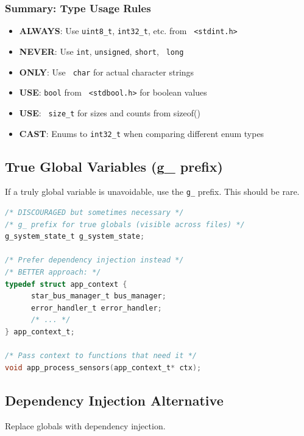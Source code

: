 \subsubsection{Summary:
      Type Usage Rules}

\begin{itemize}
    \item \textbf{ALWAYS}: Use \texttt{uint8\_t}, \texttt{int32\_t}, etc. from \texttt{
<stdint.h>}
    \item \textbf{NEVER}: Use \texttt{int}, \texttt{unsigned}, \texttt{short}, \texttt{
      long}
    \item \textbf{ONLY}: Use \texttt{
      char} for actual character strings
    \item \textbf{USE}: \texttt{bool} from \texttt{
<stdbool.h>} for boolean values
    \item \textbf{USE}: \texttt{
      size\_t} for sizes and counts from sizeof()
    \item \textbf{CAST}: Enums to \texttt{int32\_t} when comparing different enum types
\end{itemize}

\subsection{True Global Variables (g\_ prefix)}

If a truly global variable is unavoidable, use the \texttt{g\_} prefix. This should be rare.

\begin{lstlisting}[language=C]
/* DISCOURAGED but sometimes necessary */
/* g_ prefix for true globals (visible across files) */
g_system_state_t g_system_state;

/* Prefer dependency injection instead */
/* BETTER approach: */
typedef struct app_context {
      star_bus_manager_t bus_manager;
      error_handler_t error_handler;
      /* ... */
} app_context_t;

/* Pass context to functions that need it */
void app_process_sensors(app_context_t* ctx);
\end{lstlisting}

\subsection{Dependency Injection Alternative}

Replace globals with dependency injection.

